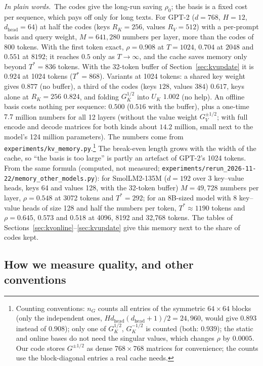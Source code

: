 \documentclass[10pt]{article}
\theoremstyle{plain}
\theoremstyle{definition}
\theoremstyle{remark}
\newcommand{\dhead}{d_{\mathrm{head}}}
\newcommand{\plain}{\noindent\emph{In plain words.}\ }
\begin{document}
\plain The codes give the long-run saving $\rho_0$; the basis is a fixed cost per sequence, which pays off only for long texts. For GPT-2 ($d=768$, $H=12$, $\dhead=64$) at half the codes (keys $R_K=256$, values $R_V=512$) with a per-prompt basis and query weight, $M=641{,}280$ numbers per layer, more than the codes of 800 tokens. With the first token exact, $\rho=0.908$ at $T=1024$, $0.704$ at $2048$ and $0.551$ at $8192$; it reaches $0.5$ only as $T\to\infty$, and the cache saves memory only beyond $T^\ast=836$ tokens. With the 32-token buffer of Section~\ref{sec:kvupdate} it is $0.924$ at 1024 tokens ($T^\ast=868$). Variants at 1024 tokens: a shared key weight gives $0.877$ (no buffer), a third of the codes (keys $128$, values $384$) $0.617$, keys alone at $R_K=256$ $0.824$, and folding $G_K^{1/2}$ into $U_K$ $1.002$ (no help). An offline basis costs nothing per sequence: $0.500$ ($0.516$ with the buffer), plus a one-time $7.7$ million numbers for all 12 layers (without the value weight $G_V^{\pm1/2}$; with full encode and decode matrices for both kinds about $14.2$ million, small next to the model's 124 million parameters). The numbers come from \texttt{experiments/kv\_memory.py}.\footnote{Counting conventions: $n_G$ counts all entries of the symmetric $64\times64$ blocks (only the independent ones, $H\dhead(\dhead+1)/2=24{,}960$, would give $0.893$ instead of $0.908$); only one of $G_K^{1/2}$, $G_K^{-1/2}$ is counted (both: $0.939$); the static and online bases do not need the singular values, which changes $\rho$ by $0.0005$. Our code stores $G^{\pm1/2}$ as dense $768\times768$ matrices for convenience; the counts use the block-diagonal entries a real cache needs.} The break-even length grows with the width of the cache, so ``the basis is too large'' is partly an artefact of GPT-2's 1024 tokens. From the same formula (computed, not measured; \texttt{experiments/rerun\_2026-11-22/memory\_other\_models.py}): for SmolLM2-135M ($d=192$ over 3 key--value heads, keys 64 and values 128, with the 32-token buffer) $M=49{,}728$ numbers per layer, $\rho=0.548$ at 3072 tokens and $T^\ast=292$; for an 8B-sized model with 8 key--value heads of size 128 and half the numbers per token, $T^\ast\approx1190$ tokens and $\rho=0.645$, $0.573$ and $0.518$ at 4096, 8192 and 32{,}768 tokens. The tables of Sections~\ref{sec:kvonline}--\ref{sec:kvupdate} give this memory next to the share of codes kept.

\subsection{How we measure quality, and other conventions}
\label{sec:measure}
\end{document}
